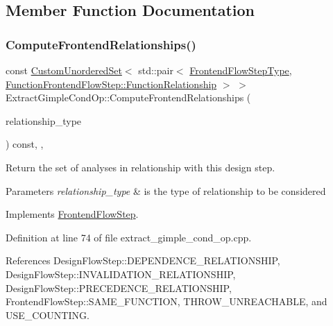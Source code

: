 \subsection{Member Function Documentation}
\mbox{\label{classExtractGimpleCondOp_a58a0db8419d00874681aa7611a502d6a}} 
\subsubsection{\texorpdfstring{Compute\+Frontend\+Relationships()}{ComputeFrontendRelationships()}}
{\footnotesize\ttfamily const \hyperlink{classCustomUnorderedSet}{Custom\+Unordered\+Set}$<$ std\+::pair$<$ \hyperlink{frontend__flow__step_8hpp_afeb3716c693d2b2e4ed3e6d04c3b63bb}{Frontend\+Flow\+Step\+Type}, \hyperlink{classFrontendFlowStep_af7cf30f2023e5b99e637dc2058289ab0}{Function\+Frontend\+Flow\+Step\+::\+Function\+Relationship} $>$ $>$ Extract\+Gimple\+Cond\+Op\+::\+Compute\+Frontend\+Relationships (\begin{DoxyParamCaption}\item[{const \hyperlink{classDesignFlowStep_a723a3baf19ff2ceb77bc13e099d0b1b7}{Design\+Flow\+Step\+::\+Relationship\+Type}}]{relationship\+\_\+type }\end{DoxyParamCaption}) const\hspace{0.3cm}{\ttfamily [override]}, {\ttfamily [private]}, {\ttfamily [virtual]}}



Return the set of analyses in relationship with this design step. 


\begin{DoxyParams}{Parameters}
{\em relationship\+\_\+type} & is the type of relationship to be considered \\
\hline
\end{DoxyParams}


Implements \hyperlink{classFrontendFlowStep_abeaff70b59734e462d347ed343dd700d}{Frontend\+Flow\+Step}.



Definition at line 74 of file extract\+\_\+gimple\+\_\+cond\+\_\+op.\+cpp.



References Design\+Flow\+Step\+::\+D\+E\+P\+E\+N\+D\+E\+N\+C\+E\+\_\+\+R\+E\+L\+A\+T\+I\+O\+N\+S\+H\+IP, Design\+Flow\+Step\+::\+I\+N\+V\+A\+L\+I\+D\+A\+T\+I\+O\+N\+\_\+\+R\+E\+L\+A\+T\+I\+O\+N\+S\+H\+IP, Design\+Flow\+Step\+::\+P\+R\+E\+C\+E\+D\+E\+N\+C\+E\+\_\+\+R\+E\+L\+A\+T\+I\+O\+N\+S\+H\+IP, Frontend\+Flow\+Step\+::\+S\+A\+M\+E\+\_\+\+F\+U\+N\+C\+T\+I\+ON, T\+H\+R\+O\+W\+\_\+\+U\+N\+R\+E\+A\+C\+H\+A\+B\+LE, and U\+S\+E\+\_\+\+C\+O\+U\+N\+T\+I\+NG.

